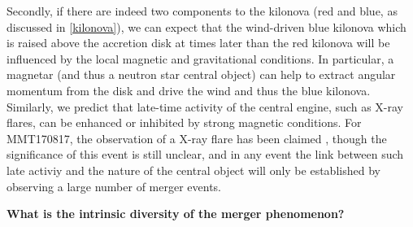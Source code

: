 Secondly, if there are indeed two components to the kilonova (red and blue, as discussed in \ref{kilonova}), we can expect that the wind-driven blue kilonova which is raised above the accretion disk at times later than the red kilonova will be influenced by the local magnetic and gravitational conditions. In particular, a magnetar (and thus a neutron star central object) can help to extract angular momentum from the disk and drive the wind and thus the blue kilonova. Similarly, we predict that late-time activity of the central engine, such as X-ray flares, can be enhanced or inhibited by strong magnetic conditions. For MMT170817, the observation of a X-ray flare has been claimed \cite{58}, though the significance of this event is still unclear, and in any event the link between such late activiy and the nature of the central object will only be established by observing a large number of merger events.


\bf{What is the intrinsic diversity of the merger phenomenon? }
